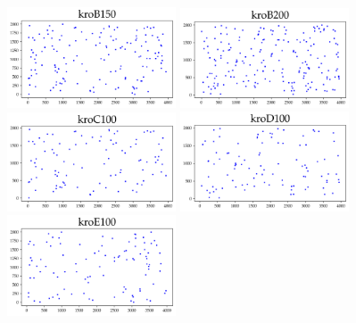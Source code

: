 \begin{appendices}
\begin{figure}[H]
\includegraphics[width=5cm]{../tsplib_euc2d_pictures_of_instances/kroB150.png}
\includegraphics[width=5cm]{../tsplib_euc2d_pictures_of_instances/kroB200.png}
\includegraphics[width=5cm]{../tsplib_euc2d_pictures_of_instances/kroC100.png}
\includegraphics[width=5cm]{../tsplib_euc2d_pictures_of_instances/kroD100.png}
\includegraphics[width=5cm]{../tsplib_euc2d_pictures_of_instances/kroE100.png}

\end{figure}


\end{appendices}
